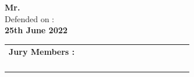 \begin{titlepage}
\begin{center}
\vspace{-5pt} {%
  \fontsize{18pt}{18pt}\selectfont%
  \textbf{Mr. \reportAuthor}\\
}%
\vspace{5pt} {%
  \fontsize{16pt}{16pt}\selectfont%
  Defended on :\\
  \fontsize{18pt}{18pt}\selectfont%
  \textbf{25th June 2022}\\
}%

\vspace{25pt} {
  \begin{tabular}{p{0.4\linewidth} p{0.35\linewidth}}
    \textbf{Jury Members :} &  \\ 
    \juryAcademicSupervisor{} & \juryAcademicSupervisorDesc{}\\
    \juryProfessionalSupervisor{} & \juryProfessionalSupervisorDesc{}\\
    \juryPresident{} & \juryPresidentDesc{}\\
    \juryMemberOne{} & \juryMemberOneDesc{}\\
  \end{tabular}
}
\vfill

\end{center}
\end{titlepage}